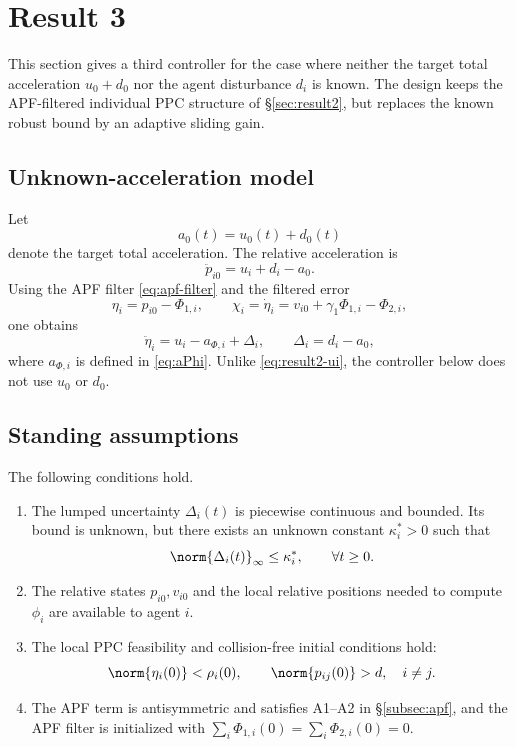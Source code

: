 \section{Result 3}
\label{sec:result3}

This section gives a third controller for the case where neither the target
total acceleration $u_0+d_0$ nor the agent disturbance $d_i$ is known.  The
design keeps the APF-filtered individual PPC structure of
\S\ref{sec:result2}, but replaces the known robust bound by an adaptive
sliding gain.

\subsection{Unknown-acceleration model}

Let
\[
a_0(t)=u_0(t)+d_0(t)
\]
denote the target total acceleration.  The relative acceleration is
\[
\ddot p_{i0}=u_i+d_i-a_0.
\]
Using the APF filter \eqref{eq:apf-filter} and the filtered error
\[
\eta_i=p_{i0}-\Phi_{1,i},\qquad
\chi_i=\dot\eta_i=v_{i0}+\gamma_1\Phi_{1,i}-\Phi_{2,i},
\]
one obtains
\begin{equation}
\ddot\eta_i=u_i-a_{\Phi,i}+\Delta_i,
\qquad
\Delta_i=d_i-a_0,
\label{eq:r3-eta-dyn}
\end{equation}
where $a_{\Phi,i}$ is defined in \eqref{eq:aPhi}.  Unlike
\eqref{eq:result2-ui}, the controller below does not use $u_0$ or $d_0$.

\subsection{Standing assumptions}

\begin{assumption}
\label{as:result3}
The following conditions hold.
\begin{enumerate}
    \item The lumped uncertainty $\Delta_i(t)$ is piecewise continuous and
    bounded.  Its bound is unknown, but there exists an unknown constant
    $\kappa_i^*>0$ such that
    \[
    \norm{\Delta_i(t)}_\infty\le \kappa_i^*,
    \qquad \forall t\ge0.
    \]

    \item The relative states $p_{i0},v_{i0}$ and the local relative
    positions needed to compute $\phi_i$ are available to agent $i$.

    \item The local PPC feasibility and collision-free initial conditions
    hold:
    \[
    \norm{\eta_i(0)}<\rho_i(0),\qquad
    \norm{p_{ij}(0)}>d,\quad i\neq j.
    \]

    \item The APF term is antisymmetric and satisfies A1--A2 in
    \S\ref{subsec:apf}, and the APF filter is initialized with
    $\sum_i\Phi_{1,i}(0)=\sum_i\Phi_{2,i}(0)=0$.
\end{enumerate}
\end{assumption}

